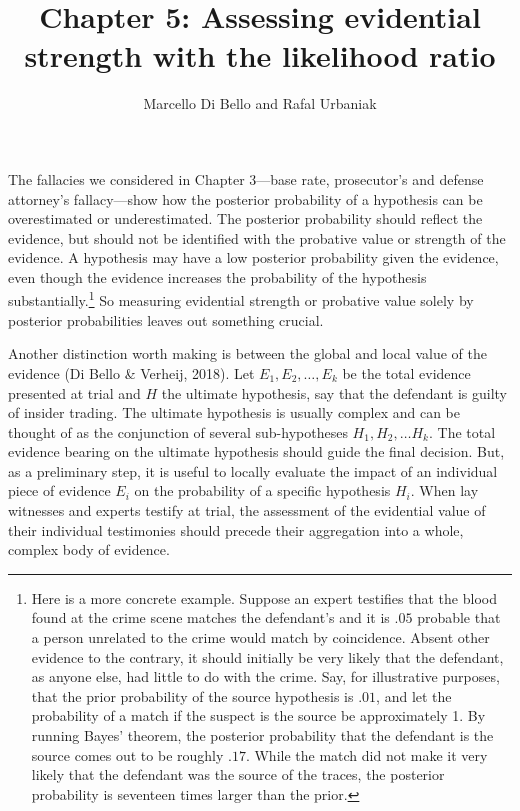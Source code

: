\documentclass[
  10pt,
  dvipsnames,enabledeprecatedfontcommands]{scrartcl}
\title{Chapter 5: Assessing evidential strength with the likelihood
ratio}
\author{Marcello Di Bello and Rafal Urbaniak}
\date{}
\begin{document}
\maketitle

The fallacies we considered in Chapter 3---base rate, prosecutor's and
defense attorney's fallacy---show how the posterior probability of a
hypothesis can be overestimated or underestimated. The posterior
probability should reflect the evidence, but should not be identified
with the probative value or strength of the evidence. A hypothesis may
have a low posterior probability given the evidence, even though the
evidence increases the probability of the hypothesis
substantially.\footnote{Here is a more concrete example. Suppose an
  expert testifies that the blood found at the crime scene matches the
  defendant's and it is \(.05\) probable that a person unrelated to the
  crime would match by coincidence. Absent other evidence to the
  contrary, it should initially be very likely that the defendant, as
  anyone else, had little to do with the crime. Say, for illustrative
  purposes, that the prior probability of the source hypothesis is
  \(.01\), and let the probability of a match if the suspect is the
  source be approximately 1. By running Bayes' theorem, the posterior
  probability that the defendant is the source comes out to be roughly
  \(.17\). While the match did not make it very likely that the
  defendant was the source of the traces, the posterior probability is
  seventeen times larger than the prior.} So measuring evidential
strength or probative value solely by posterior probabilities leaves out
something crucial.

Another distinction worth making is between the global and local value
of the evidence (Di Bello \& Verheij, 2018). Let \(E_1,E_2,\dots, E_k\)
be the total evidence presented at trial and \(H\) the ultimate
hypothesis, say that the defendant is guilty of insider trading. The
ultimate hypothesis is usually complex and can be thought of as the
conjunction of several sub-hypotheses \(H_1, H_2, \dots H_k\). The total
evidence bearing on the ultimate hypothesis should guide the final
decision. But, as a preliminary step, it is useful to locally evaluate
the impact of an individual piece of evidence \(E_i\) on the probability
of a specific hypothesis \(H_i\). When lay witnesses and experts testify
at trial, the assessment of the evidential value of their individual
testimonies should precede their aggregation into a whole, complex body
of evidence.
\end{document}
